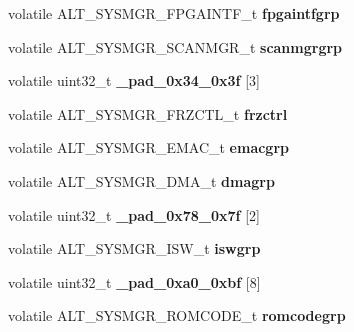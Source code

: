 \begin{DoxyCompactItemize}
volatile A\+L\+T\+\_\+\+S\+Y\+S\+M\+G\+R\+\_\+\+F\+P\+G\+A\+I\+N\+T\+F\+\_\+t {\bfseries fpgaintfgrp}
\item 
\mbox{\label{structALT__SYSMGR__s_ab643e30b3e24461d4435c6adedb6cacb}} 
volatile A\+L\+T\+\_\+\+S\+Y\+S\+M\+G\+R\+\_\+\+S\+C\+A\+N\+M\+G\+R\+\_\+t {\bfseries scanmgrgrp}
\item 
\mbox{\label{structALT__SYSMGR__s_a4e6fcc30eb5d54cfdba85b8aea2e86d3}} 
volatile uint32\+\_\+t {\bfseries \+\_\+pad\+\_\+0x34\+\_\+0x3f} \mbox{[}3\mbox{]}
\item 
\mbox{\label{structALT__SYSMGR__s_a617bd2702a35dbb03ac2ebcda2431314}} 
volatile A\+L\+T\+\_\+\+S\+Y\+S\+M\+G\+R\+\_\+\+F\+R\+Z\+C\+T\+L\+\_\+t {\bfseries frzctrl}
\item 
\mbox{\label{structALT__SYSMGR__s_aaf2e053756ade4c745fd041c2f7afd74}} 
volatile A\+L\+T\+\_\+\+S\+Y\+S\+M\+G\+R\+\_\+\+E\+M\+A\+C\+\_\+t {\bfseries emacgrp}
\item 
\mbox{\label{structALT__SYSMGR__s_a97e82f8daeac0fbeee8dd09b8b5eae3b}} 
volatile A\+L\+T\+\_\+\+S\+Y\+S\+M\+G\+R\+\_\+\+D\+M\+A\+\_\+t {\bfseries dmagrp}
\item 
\mbox{\label{structALT__SYSMGR__s_ab3aefd9df6e15cbc3f6d3d7eb5a6d91c}} 
volatile uint32\+\_\+t {\bfseries \+\_\+pad\+\_\+0x78\+\_\+0x7f} \mbox{[}2\mbox{]}
\item 
\mbox{\label{structALT__SYSMGR__s_a855082eef18f814bb902048382d9e983}} 
volatile A\+L\+T\+\_\+\+S\+Y\+S\+M\+G\+R\+\_\+\+I\+S\+W\+\_\+t {\bfseries iswgrp}
\item 
\mbox{\label{structALT__SYSMGR__s_ac1eac8ce921a5f13ae000c1faef6a382}} 
volatile uint32\+\_\+t {\bfseries \+\_\+pad\+\_\+0xa0\+\_\+0xbf} \mbox{[}8\mbox{]}
\item 
\mbox{\label{structALT__SYSMGR__s_ad4ea2c48d2ecf354f28e6bbf48dafd94}} 
volatile A\+L\+T\+\_\+\+S\+Y\+S\+M\+G\+R\+\_\+\+R\+O\+M\+C\+O\+D\+E\+\_\+t {\bfseries romcodegrp}
\item 

\end{DoxyCompactItemize}
